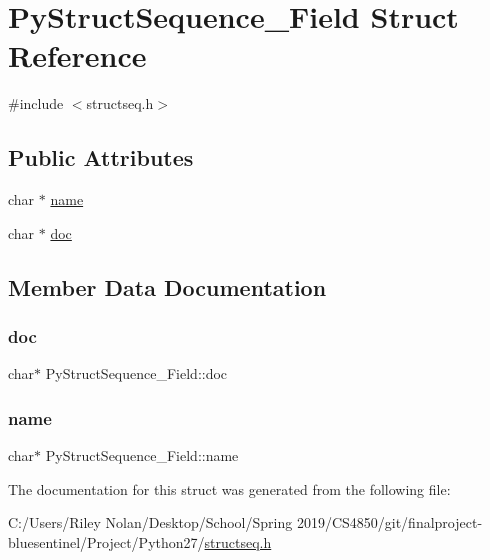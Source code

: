\hypertarget{struct_py_struct_sequence___field}{}\section{Py\+Struct\+Sequence\+\_\+\+Field Struct Reference}
\label{struct_py_struct_sequence___field}


{\ttfamily \#include $<$structseq.\+h$>$}

\subsection*{Public Attributes}
\begin{DoxyCompactItemize}
\item 
char $\ast$ \mbox{\hyperlink{struct_py_struct_sequence___field_a9ad1abe28ed8301444b36581dc3e95f7}{name}}
\item 
char $\ast$ \mbox{\hyperlink{struct_py_struct_sequence___field_a6ba9e53c3ef3bb4b92a1a2ff70f71f64}{doc}}
\end{DoxyCompactItemize}


\subsection{Member Data Documentation}
\mbox{\label{struct_py_struct_sequence___field_a6ba9e53c3ef3bb4b92a1a2ff70f71f64}} 
\subsubsection{\texorpdfstring{doc}{doc}}
{\footnotesize\ttfamily char$\ast$ Py\+Struct\+Sequence\+\_\+\+Field\+::doc}

\mbox{\label{struct_py_struct_sequence___field_a9ad1abe28ed8301444b36581dc3e95f7}} 
\subsubsection{\texorpdfstring{name}{name}}
{\footnotesize\ttfamily char$\ast$ Py\+Struct\+Sequence\+\_\+\+Field\+::name}



The documentation for this struct was generated from the following file\+:\begin{DoxyCompactItemize}
\item 
C\+:/\+Users/\+Riley Nolan/\+Desktop/\+School/\+Spring 2019/\+C\+S4850/git/finalproject-\/bluesentinel/\+Project/\+Python27/\mbox{\hyperlink{structseq_8h}{structseq.\+h}}\end{DoxyCompactItemize}
